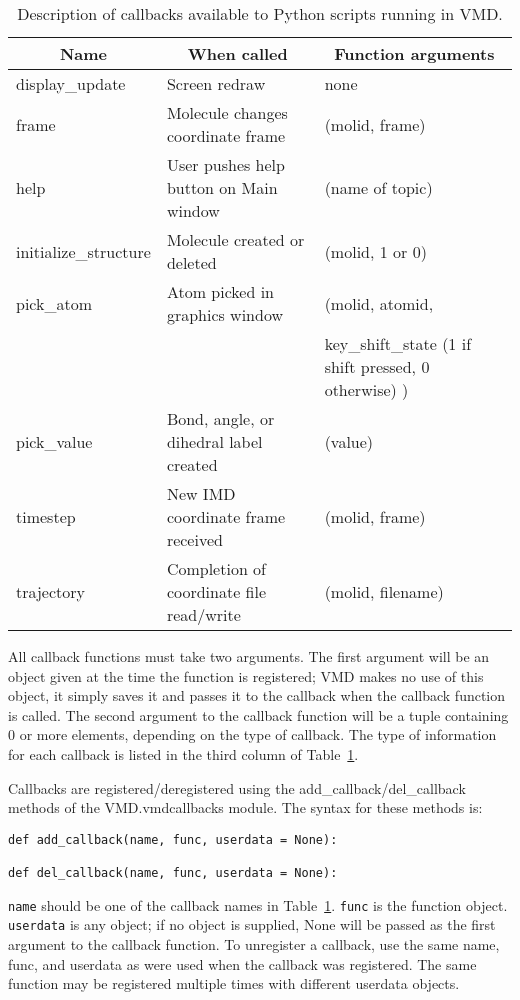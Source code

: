 \begin{table}[htb]
\label{table:ug:pythoncallbacks}
\caption{Description of callbacks available to Python scripts running in VMD.}
\begin{tabular}{|l|l|l|} \hline
	\multicolumn{1}{|c}{Name} & 
	\multicolumn{1}{|c|}{When called} &
	\multicolumn{1}{|c|}{Function arguments}
	\\ \hline\hline

display\_update & Screen redraw & none \\
frame           & Molecule changes coordinate frame & (molid, frame) \\
help            & User pushes help button on Main window & (name of topic) \\
initialize\_structure & Molecule created or deleted & (molid, 1 or 0) \\
pick\_atom      & Atom picked in graphics window & (molid, atomid, \\
                &                                & key\_shift\_state (1 if shift pressed, 0 otherwise) ) \\
pick\_value     & Bond, angle, or dihedral label created & (value) \\
timestep        & New IMD coordinate frame received & (molid, frame) \\
trajectory      & Completion of coordinate file read/write & (molid, filename)\\

\hline
\end{tabular}
\end{table}

All callback functions must take two arguments.  The first
argument will be an object given at the time the function is registered;
VMD makes no use of this object, it simply saves it and passes it to the
callback when the callback function is called.  The second argument to the
callback function will be a tuple containing 0 or more elements, depending
on the type of callback.  The type of information for each callback is listed
in the third column of Table~\ref{table:ug:pythoncallbacks}.

Callbacks are registered/deregistered using the add\_callback/del\_callback
methods of the VMD.vmdcallbacks module.  The syntax for these methods is:
\begin{verbatim}
def add_callback(name, func, userdata = None):

def del_callback(name, func, userdata = None):
\end{verbatim}
{\tt name} should be one of the callback names in 
Table~\ref{table:ug:pythoncallbacks}.  {\tt func} is the function object.
{\tt userdata} is any object; if no object is supplied, None will be passed
as the first argument to the callback function.  To unregister a callback,
use the same name, func, and userdata as were used when the callback was
registered.  The same function may be registered multiple times with different
userdata objects.

